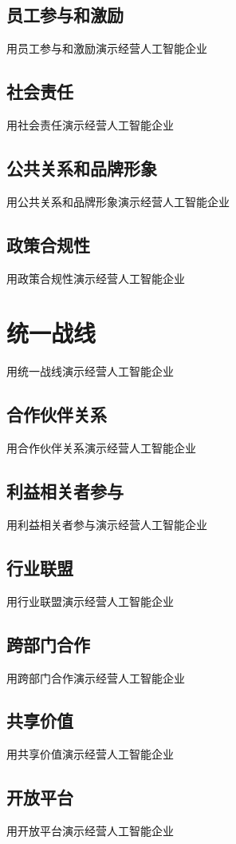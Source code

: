 \documentclass[12pt]{book}
\begin{document}
\subsection{员工参与和激励}
用员工参与和激励演示经营人工智能企业

\subsection{社会责任}
用社会责任演示经营人工智能企业

\subsection{公共关系和品牌形象}
用公共关系和品牌形象演示经营人工智能企业

\subsection{政策合规性}
用政策合规性演示经营人工智能企业


\section{统一战线}
用统一战线演示经营人工智能企业
\subsection{合作伙伴关系}
用合作伙伴关系演示经营人工智能企业

\subsection{利益相关者参与}
用利益相关者参与演示经营人工智能企业

\subsection{行业联盟}
用行业联盟演示经营人工智能企业

\subsection{跨部门合作}
用跨部门合作演示经营人工智能企业

\subsection{共享价值}
用共享价值演示经营人工智能企业

\subsection{开放平台}
用开放平台演示经营人工智能企业
\end{document}
